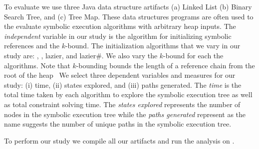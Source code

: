 To evaluate we use three Java data structure artifacts (a) Linked List
(b) Binary Search Tree, and (c) Tree Map. These data structures
programs are often used to the evaluate symbolic execution algorithms
with arbitrary heap inputs. The \emph{independent} variable in our
study is the algorithm for initializing symbolic references and the
$k$-bound. The initialization algorithms that we vary in our study
are: \symtxt{}, \gsetxt{}, lazier, and lazier\#. We also vary the
$k$-bound for each the algorithms. Note that $k$-bounding bounds the
length of a reference chain from the root of the heap~\cite{Deng:2006}
We select three dependent variables and measures for our study: (i)
time, (ii) states explored, and (iii) paths generated. The \emph{time}
is the total time taken by each algorithm to explore the symbolic
execution tree as well as total constraint solving time. The
\emph{states explored} represents the number of nodes in the symbolic
execution tree while the \emph{paths generated} represent as the name
suggests the number of unique paths in the symbolic execution tree.

To perform our study we compile all our artifacts and run the analysis
on .


